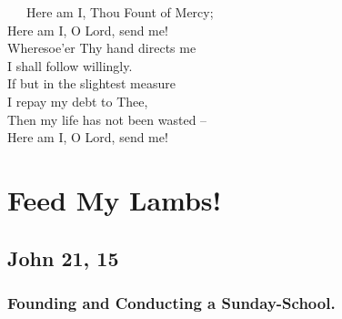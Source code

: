 \documentclass[
]{book}
\begin{document}
~~~Here am I, Thou Fount of Mercy;\\
\hspace*{0.333em}\hspace*{0.333em}\hspace*{0.333em}Here am I, O Lord, send me!\\
\hspace*{0.333em}\hspace*{0.333em}\hspace*{0.333em}Wheresoe'er Thy hand directs me\\
\hspace*{0.333em}\hspace*{0.333em}\hspace*{0.333em}I shall follow willingly.\\
\hspace*{0.333em}\hspace*{0.333em}\hspace*{0.333em}If but in the slightest measure\\
\hspace*{0.333em}\hspace*{0.333em}\hspace*{0.333em}I repay my debt to Thee,\\
\hspace*{0.333em}\hspace*{0.333em}\hspace*{0.333em}Then my life has not been wasted --\\
\hspace*{0.333em}\hspace*{0.333em}\hspace*{0.333em}Here am I, O Lord, send me!

\hypertarget{feed-my-lambs}{%
\chapter{Feed My Lambs!}\label{feed-my-lambs}}

\hypertarget{john-21-15}{%
\section*{John 21, 15}\label{john-21-15}}

\hypertarget{founding-and-conducting-a-sunday-school.}{%
\subsection*{Founding and Conducting a Sunday-School.}\label{founding-and-conducting-a-sunday-school.}}
\end{document}
